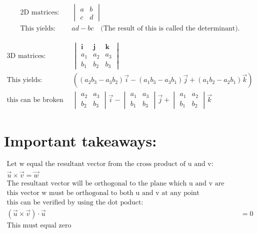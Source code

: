 \documentclass{article}
\begin{document}
\begin{align*}
    \text{2D matrices:} \quad
    &\begin{vmatrix}
        a & b \\
        c & d 
    \end{vmatrix} \\
    \text{This yields:} \quad 
    &ad - bc \quad \text{(The result of this is called the determinant).}
\end{align*}

\begin{align*}
    \text{3D matrices:} \quad
    &\begin{vmatrix}
    \mathbf{i} & \mathbf{j} & \mathbf{k} \\
        a_1 & a_2 & a_3 \\
        b_1 & b_2 & b_3
    \end{vmatrix} \\
    \text{This yields:} \quad 
    &((a_2 b_3 - a_3 b_2)\vec{i} - (a_1 b_3 - a_3 b_1)\vec{j} + (a_1 b_2 - a_2 b_1)\vec{k}) \\
    \text{this can be broken down into:} \quad
    &\begin{vmatrix}
        a_2 & a_3 \\
        b_2 & b_3
    \end{vmatrix} \vec{i}
    - \begin{vmatrix}
        a_1 & a_3 \\
        b_1 & b_3
    \end{vmatrix} \vec{j}
    + \begin{vmatrix}
        a_1 & a_2 \\
        b_1 & b_2
    \end{vmatrix} \vec{k}
\end{align*}

\section*{Important takeaways:}

\begin{align*}
    \text{Let w equal the resultant vector from the cross product of u and v:} \\
    \vec{u} \times \vec{v} = \vec{w} \\
    \text{The resultant vector will be orthogonal to the plane which u and v are on.} \\
    \text{this vector w must be orthogonal to both u and v at any point} \\
    \text{this can be verified by using the dot poduct:} \\
    (\vec{u} \times \vec{v}) \cdot \vec{u} &= 0 \\
    \text{This must equal zero}
\end{align*}
\end{document}
